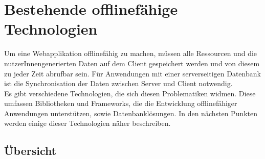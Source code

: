 %
%
\chapter{\label{chap:state}Bestehende offlinefähige Technologien}
Um eine Webapplikation offlinefähig zu machen, müssen alle Ressourcen und die nutzerInnengenerierten Daten auf dem Client gespeichert werden und von diesem zu jeder Zeit abrufbar sein.
Für Anwendungen mit einer serverseitigen Datenbank ist die Synchronisation der Daten zwischen Server und Client notwendig.\\
Es gibt verschiedene Technologien, die sich diesen Problematiken widmen.
Diese umfassen Bibliotheken und Frameworks, die die Entwicklung offlinefähiger Anwendungen unterstützen, sowie Datenbanklösungen. In den nächsten Punkten werden einige dieser Technologien näher beschreiben.
%
%

%
%

%
%

%
%

%
%

%
\section{Übersicht}
